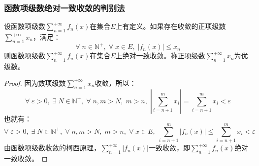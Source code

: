 \subsubsection{函数项级数绝对一致收敛的判别法}
\begin{theorem}[Weierstrass判别法]
	设函数项级数$\sum\limits_{n=1}^{+\infty}f_n(x)$在集合$E$上有定义。如果存在收敛的正项级数$\sum\limits_{n=1}^{+\infty}x_n$，满足：
	\begin{equation*}
		\forall\;n\in\mathbb{N}^+,\;\forall\;x\in E,\;|f_n(x)|\leqslant x_n
	\end{equation*}
	则函数项级数$\sum\limits_{n=1}^{+\infty}f_n(x)$在集合$E$上绝对一致收敛。称正项级数$\sum\limits_{n=1}^{+\infty}x_n$为优级数。
\end{theorem}
\begin{proof}
	因为数项级数$\sum\limits_{n=1}^{+\infty}x_n$收敛，所以：
	\begin{equation*}
		\forall\;\varepsilon>0,\;\exists\;N\in\mathbb{N}^+,\;\forall\;n,m>N,\;m>n,\;\left|\sum_{i=n+1}^mx_i\right|=\sum_{i=n+1}^mx_i<\varepsilon
	\end{equation*}
	也就有：
	\begin{equation*}
		\forall\;\varepsilon>0,\;\exists\;N\in\mathbb{N}^+,\;\forall\;n,m>N,\;m>n,\;\forall\;x\in E,\;\sum_{i=n+1}^m|f_n(x)|\leqslant\sum_{i=n+1}^mx_i<\varepsilon
	\end{equation*}
	由函数项级数收敛的柯西原理，$\sum\limits_{n=1}^{+\infty}|f_n(x)|$一致收敛，即$\sum\limits_{n=1}^{+\infty}f_n(x)$绝对一致收敛。
\end{proof}
